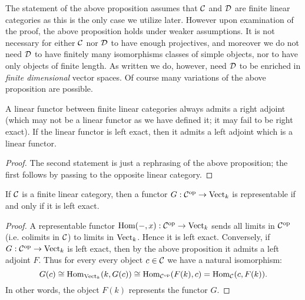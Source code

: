 \documentclass{amsart}
\begin{document}
\begin{remark}
	The statement of the above proposition assumes that $\mathcal C$ and $\mathcal D$ are finite linear categories as this is the only case we utilize later. However upon examination of the proof, the above proposition holds under weaker assumptions. It is not necessary for either $\mathcal C$ nor $\mathcal D$ to have enough projectives, and moreover we do not need $\mathcal D$ to have finitely many isomorphisms classes of simple objects, nor to have only objects of finite length. As written we do, however, need $\mathcal D$ to be enriched in {\em finite dimensional} vector spaces. Of course many variations of the above proposition are possible. 
\end{remark}

\begin{corollary}
	A linear functor between finite linear categories always admits a right adjoint (which may not be a linear functor as we have defined it; it may fail to be right exact). If the linear functor is left exact, then it admits a left adjoint which is a linear functor. 
\end{corollary}

\begin{proof}
	The second statement is just a rephrasing of the above proposition; the first follows by passing to the opposite linear category.  
\end{proof}


\begin{corollary}
If $\mathcal C$ is a finite linear category, then a functor $G: \mathcal C^\textrm{op} \to \mathrm{Vect}_k$ is representable if and only if it is left exact. 
\end{corollary}

\begin{proof}
	A representable functor $\operatorname{Hom}(-, x):\mathcal C^\text{op} \to \mathrm{Vect}_k$ sends all limits in $\mathcal C^\text{op}$ (i.e. colimits in $\mathcal C$) to limits in $\mathrm{Vect}_k$. Hence it is left exact. 
%
%		
Conversely, if $G: \mathcal C^\text{op} \to \mathrm{Vect}_k$ is left exact, then by the above proposition it admits a left adjoint $F$. Thus for every every object $c \in \mathcal C$ we have a natural isomorphism:
	\begin{equation*}
		G(c) \cong \operatorname{Hom}_{\mathrm{Vect}_k}( k, G(c)) \cong \operatorname{Hom}_{\mathcal C^{\mathrm{op}}}( F(k), c) = \operatorname{Hom}_{\mathcal C}(c, F(k) ).
	\end{equation*}
	In other words,  the object $F(k)$ represents the functor $G$. 
\end{proof}
\end{document}
